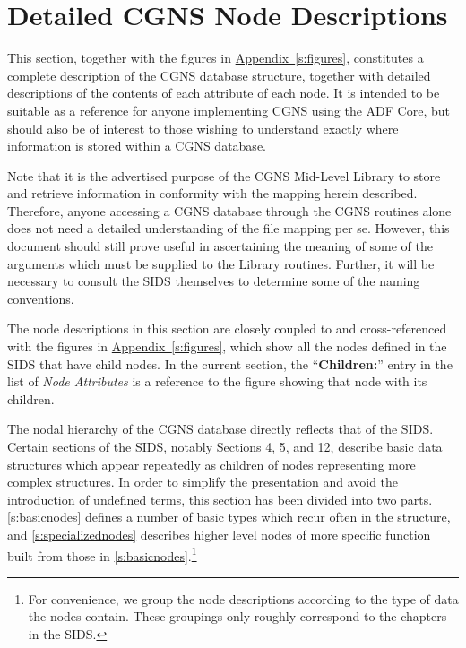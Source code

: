 \section{Detailed CGNS Node Descriptions}
\label{s:nodes}
\thispagestyle{plain}

This section, together with the figures in
\hyperref[s:figures]{Appendix~\ref*{s:figures}}, constitutes a complete
description of the CGNS database structure, together with detailed
descriptions of the contents of each attribute of each node. It is
intended to be suitable as a reference for anyone implementing CGNS
using the ADF Core, but should also be of interest to those wishing to
understand exactly where information is stored within a CGNS database.

Note that it is the advertised purpose of the CGNS Mid-Level Library to
store and retrieve information in conformity with the mapping herein
described. Therefore, anyone accessing a CGNS database through the
CGNS routines alone does not need a detailed understanding of the file
mapping per se. However, this document should still prove useful in
ascertaining the meaning of some of the arguments which must be supplied
to the Library routines. Further, it will be necessary to consult the
SIDS themselves to determine some of the naming conventions.

The node descriptions in this section are closely
coupled to and cross-referenced with the figures in
\hyperref[s:figures]{Appendix~\ref*{s:figures}}, which show all the
nodes defined in the SIDS that have child nodes.
In the current section, the ``\textbf{Children:}'' entry in the list of
\textit{Node Attributes} is a reference to the figure showing that node
with its children.

The nodal hierarchy of the CGNS database directly reflects that of the
SIDS. Certain sections of the SIDS, notably Sections 4, 5, and 12,
describe basic data structures which appear repeatedly as children
of nodes representing more complex structures. In order to simplify
the presentation and avoid the introduction of undefined terms, this
section has been divided into two parts. \autoref{s:basicnodes}
defines a number of basic types which recur often in the structure,
and \autoref{s:specializednodes} describes higher level nodes of more
specific function built from those in \autoref{s:basicnodes}.\footnote{For
convenience, we group the node descriptions according to the type of
data the nodes contain. These groupings only roughly correspond to the
chapters in the SIDS.}

